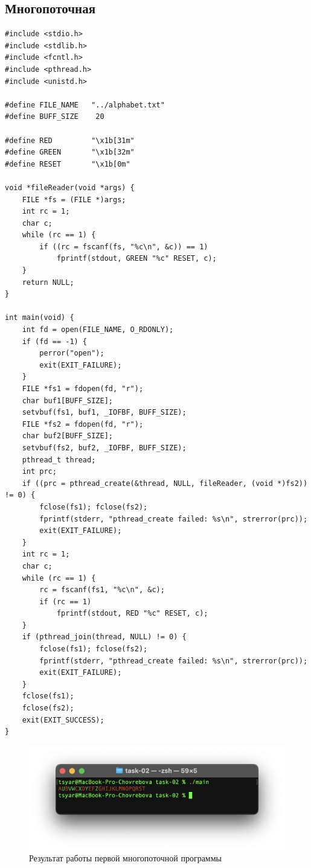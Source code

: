 \subsection*{Многопоточная}
\begin{lstlisting}[caption=Первая программа (многопоточная),label=lst:FILEstruct11]
#include <stdio.h>
#include <stdlib.h>
#include <fcntl.h>
#include <pthread.h>
#include <unistd.h>

#define FILE_NAME 	"../alphabet.txt"
#define BUFF_SIZE    20

#define RED         "\x1b[31m"
#define GREEN       "\x1b[32m"
#define RESET       "\x1b[0m"

void *fileReader(void *args) {
	FILE *fs = (FILE *)args;
	int rc = 1;
	char c;
	while (rc == 1) {
		if ((rc = fscanf(fs, "%c\n", &c)) == 1)
			fprintf(stdout, GREEN "%c" RESET, c);
	}
	return NULL;
}

int main(void) {
	int fd = open(FILE_NAME, O_RDONLY);
	if (fd == -1) {
		perror("open");
		exit(EXIT_FAILURE);
	}
	FILE *fs1 = fdopen(fd, "r");
	char buf1[BUFF_SIZE];
	setvbuf(fs1, buf1, _IOFBF, BUFF_SIZE);
	FILE *fs2 = fdopen(fd, "r");
	char buf2[BUFF_SIZE];
	setvbuf(fs2, buf2, _IOFBF, BUFF_SIZE);
	pthread_t thread;
	int prc;
	if ((prc = pthread_create(&thread, NULL, fileReader, (void *)fs2)) != 0) {
		fclose(fs1); fclose(fs2);
		fprintf(stderr, "pthread_create failed: %s\n", strerror(prc));
		exit(EXIT_FAILURE);
	}
	int rc = 1;
	char c;
	while (rc == 1) {
		rc = fscanf(fs1, "%c\n", &c);
		if (rc == 1)
			fprintf(stdout, RED "%c" RESET, c);
	}
	if (pthread_join(thread, NULL) != 0) {
		fclose(fs1); fclose(fs2);
		fprintf(stderr, "pthread_create failed: %s\n", strerror(prc));
		exit(EXIT_FAILURE);
	}
	fclose(fs1);
	fclose(fs2);
	exit(EXIT_SUCCESS);
}
\end{lstlisting}

\begin{figure}[h!] 
	\centering
	\includegraphics[width=1.0\textwidth]{./img/first-02.png}
	\caption{Результат работы первой многопоточной программы}
	\label{fig:4}
\end{figure}

